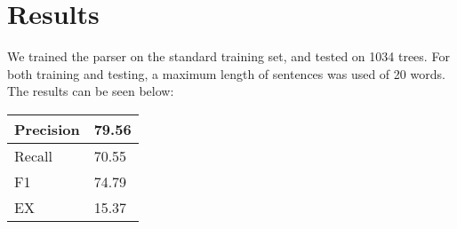 \documentclass{article}
\begin{document}
\begin{itemize}
\begin{program}
\end{program}

\end{itemize}

\section{Results}

We trained the parser on the standard training set, and tested on 1034 trees. For both training and testing, a maximum length of sentences was used of 20 words. The results can be seen below:


\begin{tabular}{| l | l |}
    \hline
    Precision & 79.56 \\ \hline
    Recall & 70.55 \\ \hline
    F1 & 74.79\\ \hline
    EX & 15.37\\ \hline
\end{tabular}
\end{document}
